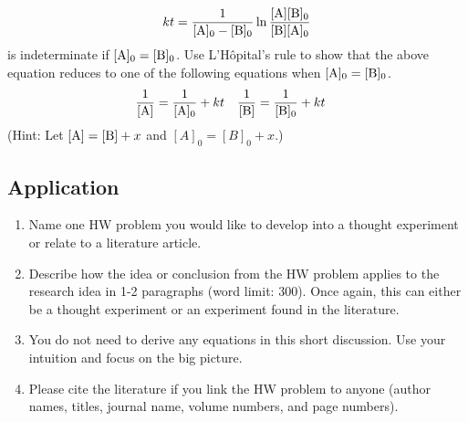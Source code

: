 \documentclass[../psets.tex]{subfiles}
\begin{document}
\begin{enumerate}[label={\textbf{28-\arabic*.}},leftmargin=3.5em]
    \begin{equation*}
        kt = \frac{1}{[\ce{A}]_0-[\ce{B}]_0}\ln\frac{[\ce{A}][\ce{B}]_0}{[\ce{B}][\ce{A}]_0}
    \end{equation*}
    is indeterminate if $[\ce{A}]_0=[\ce{B}]_0$. Use L'H\^{o}pital's rule to show that the above equation reduces to one of the following equations when $[\ce{A}]_0=[\ce{B}]_0$.
    \begin{align*}
        \frac{1}{[\ce{A}]} &= \frac{1}{[\ce{A}]_0}+kt&
        \frac{1}{[\ce{B}]} &= \frac{1}{[\ce{B}]_0}+kt
    \end{align*}
    (Hint: Let $[\ce{A}]=[\ce{B}]+x$ and $[A]_0=[B]_0+x$.)
\end{enumerate}


\subsection*{Application}
\begin{enumerate}[label={\arabic*)}]
    \item Name one HW problem you would like to develop into a thought experiment or relate to a literature article.
    \item Describe how the idea or conclusion from the HW problem applies to the research idea in 1-2 paragraphs (word limit: 300). Once again, this can either be a thought experiment or an experiment found in the literature.
    \item You do not need to derive any equations in this short discussion. Use your intuition and focus on the big picture.
    \item Please cite the literature if you link the HW problem to anyone (author names, titles, journal name, volume numbers, and page numbers).
\end{enumerate}
\end{document}
